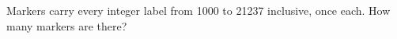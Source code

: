 Markers carry every integer label from 1000 to 21237 inclusive, once each. How many markers are there?
